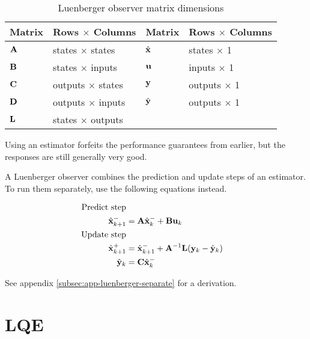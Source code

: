 \begin{table}[ht]
  \renewcommand{\arraystretch}{1.5}
  \centering
  \begin{tabular}{|ll|ll|}
    \hline
    \rowcolor{headingbg}
    \textbf{Matrix} & \textbf{Rows $\times$ Columns} &
    \textbf{Matrix} & \textbf{Rows $\times$ Columns} \\
    \hline
    $\mathbf{A}$ & states $\times$ states & $\hat{\mathbf{x}}$ & states $\times$ 1 \\
    $\mathbf{B}$ & states $\times$ inputs & $\mathbf{u}$ & inputs $\times$ 1 \\
    $\mathbf{C}$ & outputs $\times$ states & $\mathbf{y}$ & outputs $\times$ 1 \\
    $\mathbf{D}$ & outputs $\times$ inputs & $\hat{\mathbf{y}}$ & outputs $\times$ 1 \\
    $\mathbf{L}$ & states $\times$ outputs &  &  \\
    \hline
  \end{tabular}
  \caption{Luenberger observer matrix dimensions}
  \label{tab:luenberger_matrix_dims}
\end{table}

Using an estimator forfeits the performance guarantees from earlier, but the
responses are still generally very good.

A Luenberger observer combines the prediction and update steps of an estimator.
To run them separately, use the following equations instead.

\begin{theorem}
  \begin{align}
    \text{Predict step} \nonumber \\
    \hat{\mathbf{x}}_{k+1}^- &= \mathbf{A}\hat{\mathbf{x}}_k^- + \mathbf{B}\mathbf{u}_k \\
    \text{Update step} \nonumber \\
    \hat{\mathbf{x}}_{k+1}^+ &= \hat{\mathbf{x}}_{k+1}^- + \mathbf{A}^{-1}\mathbf{L}
      (\mathbf{y}_k - \hat{\mathbf{y}}_k) \\
    \hat{\mathbf{y}}_k &= \mathbf{C} \hat{\mathbf{x}}_k^-
  \end{align}
\end{theorem}

See appendix \ref{subsec:app-luenberger-separate} for a derivation.

\section{LQE}

